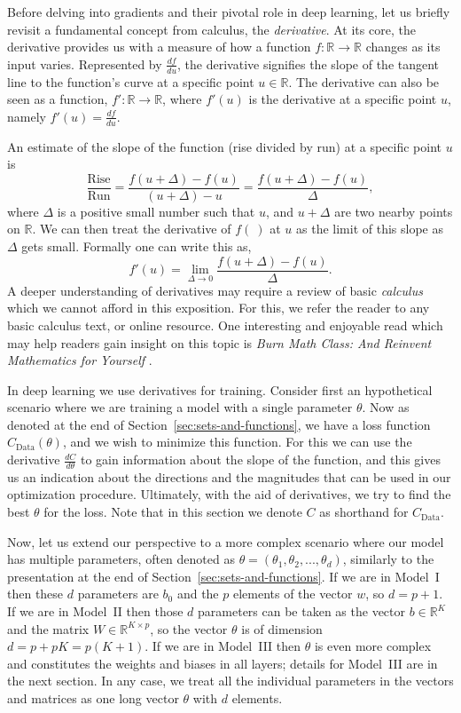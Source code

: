 Before delving into gradients and their pivotal role in deep learning, let us briefly revisit a fundamental concept from calculus, the {\em derivative}. At its core, the derivative provides us with a measure of how a function $f: {\mathbb R} \to {\mathbb R}$ changes as its input varies. Represented by \( \frac{df}{du} \), the derivative signifies the slope of the tangent line to the function's curve at a specific point $u \in {\mathbb R}$. The derivative can also be seen as a function, $f':{\mathbb R} \to {\mathbb R}$, where $f'(u)$ is the derivative at a specific point $u$, namely $f'(u) = \frac{df}{du}$.  

An estimate of the slope of the function (rise divided by run) at a specific point $u$ is
%
\[
\frac{\textrm{Rise}}{\textrm{Run}} = \frac{f(u+\Delta) - f(u)}{(u+\Delta) - u} = \frac{f(u+\Delta) - f(u)}{\Delta},  
\]
%
where $\Delta$ is a positive small number such that $u$, and $u + \Delta$ are two nearby points on ${\mathbb R
}$. We can then treat the derivative of $f(~)$ at $u$ as the limit of this slope as $\Delta$ gets small. Formally one can write this as,
%
\[
f'(u) = \lim_{\Delta \to 0} \frac{f(u+\Delta) - f(u)}{\Delta}.
\]
%
A deeper understanding of derivatives may require a review of basic {\em calculus} which we cannot afford in this exposition. For this, we refer the reader to any basic calculus text, or online resource. One interesting and enjoyable read which may help readers gain insight on this topic is {\em Burn Math Class: And Reinvent Mathematics for Yourself} \cite{wilkes2016burn}.

In deep learning we use derivatives for training. Consider first an hypothetical scenario where we are training a model with a single parameter $\theta$. Now as denoted at the end of Section~\ref{sec:sets-and-functions}, we have a loss function $C_{\textrm{Data}}(\theta)$, and we wish to minimize this function. For this we can use the derivative $\frac{dC}{d\theta}$ to gain information about the slope of the function, and this gives us an indication about the directions and the magnitudes that can be used in our optimization procedure. Ultimately, with the aid of derivatives, we try to find the best $\theta$ for the loss. Note that in this section we denote $C$ as shorthand for $C_{\textrm{Data}}$.

Now, let us extend our perspective to a more complex scenario where our model has multiple parameters, often denoted as $\theta = (\theta_1, \theta_2, ..., \theta_d)$, similarly to the presentation at the end of Section~\ref{sec:sets-and-functions}. If we are in Model~I then these $d$ parameters are $b_0$ and the $p$ elements of the vector $w$, so $d=p+1$. If we are in Model~II then those $d$ parameters can be taken as the vector $b \in {\mathbb R}^K$ and the matrix $W \in {\mathbb R}^{K\times p}$, so the vector $\theta$ is of dimension $d = p + pK = p(K+1)$. If we are in Model~III then $\theta$ is even more complex and constitutes the weights and biases in all layers; details for Model~III are in the next section. In any case, we treat all the individual parameters in the vectors and matrices as one long vector $\theta$ with $d$ elements.  

